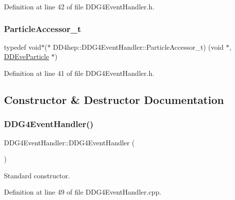 Definition at line 42 of file D\+D\+G4\+Event\+Handler.\+h.

\hypertarget{class_d_d4hep_1_1_d_d_g4_event_handler_a7087d24560986c2f222cd60bdf177b0a}{}\label{class_d_d4hep_1_1_d_d_g4_event_handler_a7087d24560986c2f222cd60bdf177b0a} 
\subsubsection{\texorpdfstring{Particle\+Accessor\+\_\+t}{ParticleAccessor\_t}}
{\footnotesize\ttfamily typedef void$\ast$($\ast$ D\+D4hep\+::\+D\+D\+G4\+Event\+Handler\+::\+Particle\+Accessor\+\_\+t) (void $\ast$, \hyperlink{class_d_d4hep_1_1_d_d_eve_particle}{D\+D\+Eve\+Particle} $\ast$)}



Definition at line 41 of file D\+D\+G4\+Event\+Handler.\+h.



\subsection{Constructor \& Destructor Documentation}
\hypertarget{class_d_d4hep_1_1_d_d_g4_event_handler_af3bf78e2d9ae9789b6e9a0ff8c332a07}{}\label{class_d_d4hep_1_1_d_d_g4_event_handler_af3bf78e2d9ae9789b6e9a0ff8c332a07} 
\subsubsection{\texorpdfstring{D\+D\+G4\+Event\+Handler()}{DDG4EventHandler()}}
{\footnotesize\ttfamily D\+D\+G4\+Event\+Handler\+::\+D\+D\+G4\+Event\+Handler (\begin{DoxyParamCaption}{ }\end{DoxyParamCaption})}



Standard constructor. 



Definition at line 49 of file D\+D\+G4\+Event\+Handler.\+cpp.

